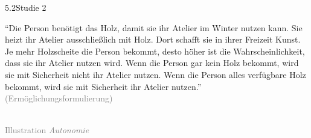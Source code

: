 \documentclass[xcolor=table,9pt,aspectratio=169]{beamer}
\begin{document}
\begin{frame}{\vspace*{10mm}5.2\hspace*{1em}Studie 2}
\begin{multicols}{2}
   \enquote{Die Person benötigt das Holz, damit sie ihr Atelier im Winter nutzen kann. Sie heizt ihr Atelier ausschließlich mit Holz. Dort schafft sie in ihrer Freizeit Kunst. Je mehr Holzscheite die Person bekommt, desto höher ist die Wahrscheinlichkeit, dass sie ihr Atelier nutzen wird. Wenn die Person gar kein Holz bekommt, wird sie mit Sicherheit nicht ihr Atelier nutzen. Wenn die Person alles verfügbare Holz bekommt, wird sie mit Sicherheit ihr Atelier nutzen.}\\
   \medskip
   \textcolor{gray}{(Ermöglichungsformulierung)}
   \vfill
   \begin{center}
      \\
      \textcolor{gray}{Illustration \textit{Autonomie}}
   \end{center}
\end{multicols}
\end{frame}
\end{document}
